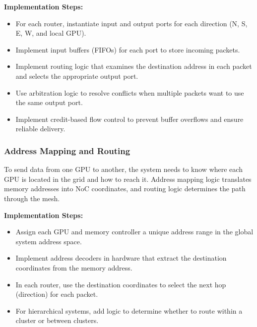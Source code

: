 \documentclass[11pt,a4paper]{article}
\begin{document}
\textbf{Implementation Steps:}
\begin{itemize}
    \item For each router, instantiate input and output ports for each direction (N, S, E, W, and local GPU).
    \item Implement input buffers (FIFOs) for each port to store incoming packets.
    \item Implement routing logic that examines the destination address in each packet and selects the appropriate output port.
    \item Use arbitration logic to resolve conflicts when multiple packets want to use the same output port.
    \item Implement credit-based flow control to prevent buffer overflows and ensure reliable delivery.
\end{itemize}

\subsubsection{Address Mapping and Routing}
To send data from one GPU to another, the system needs to know where each GPU is located in the grid and how to reach it. Address mapping logic translates memory addresses into NoC coordinates, and routing logic determines the path through the mesh.

\textbf{Implementation Steps:}
\begin{itemize}
    \item Assign each GPU and memory controller a unique address range in the global system address space.
    \item Implement address decoders in hardware that extract the destination coordinates from the memory address.
    \item In each router, use the destination coordinates to select the next hop (direction) for each packet.
    \item For hierarchical systems, add logic to determine whether to route within a cluster or between clusters.
\end{itemize}
\end{document}
